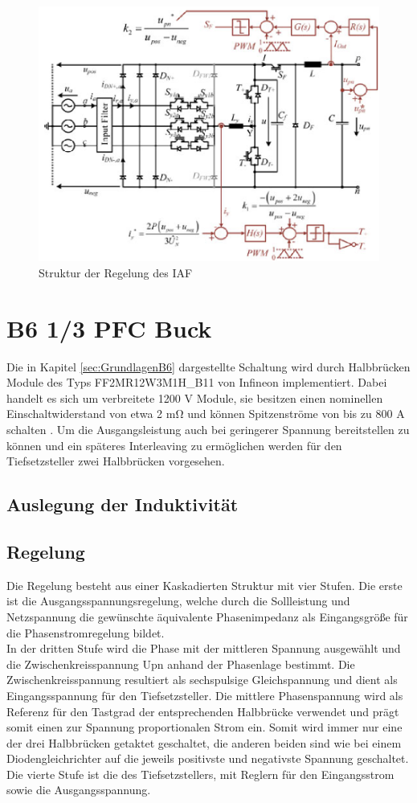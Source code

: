 	
	 \begin{figure}
	 	\centering
	 	\includegraphics[width=0.7\linewidth]{IAF_Paper_Control}
	 	\caption{Struktur der Regelung des IAF \cite{Soeiro.2013}}
	 	\label{fig:iafpapercontrol}
	 \end{figure}
	 




\section{B6 1/3 PFC Buck}
Die in Kapitel \ref{sec:GrundlagenB6} dargestellte Schaltung wird durch Halbbrücken Module des Typs FF2MR12W3M1H\_B11 von Infineon implementiert. Dabei handelt es sich um verbreitete 1200 \si{\volt} Module, sie besitzen einen nominellen Einschaltwiderstand von etwa 2 \si{\milli \ohm} und können Spitzenströme von bis zu 800 \si{\ampere} schalten \cite{IFAGFF2}. Um die Ausgangsleistung auch bei geringerer Spannung bereitstellen zu können und ein späteres Interleaving zu ermöglichen werden für den Tiefsetzsteller zwei Halbbrücken vorgesehen.

\subsection{Auslegung der Induktivität}


\subsection{Regelung}
Die Regelung besteht aus einer Kaskadierten Struktur mit vier Stufen. Die erste ist die Ausgangsspannungsregelung, welche durch die Sollleistung und Netzspannung die gewünschte äquivalente Phasenimpedanz als Eingangsgröße für die Phasenstromregelung bildet.\\
In der dritten Stufe wird die Phase mit der mittleren Spannung ausgewählt und die Zwischenkreisspannung \gls{Upn} anhand der Phasenlage bestimmt. Die Zwischenkreisspannung resultiert als sechspulsige Gleichspannung und dient als Eingangsspannung für den Tiefsetzsteller. Die mittlere Phasenspannung wird als Referenz für den Tastgrad der entsprechenden Halbbrücke verwendet und prägt somit einen zur Spannung proportionalen Strom ein. Somit wird immer nur eine der drei Halbbrücken getaktet geschaltet, die anderen beiden sind wie bei einem Diodengleichrichter auf die jeweils positivste und negativste Spannung geschaltet.\\
Die vierte Stufe ist die des Tiefsetzstellers, mit Reglern für den Eingangsstrom sowie die Ausgangsspannung.

